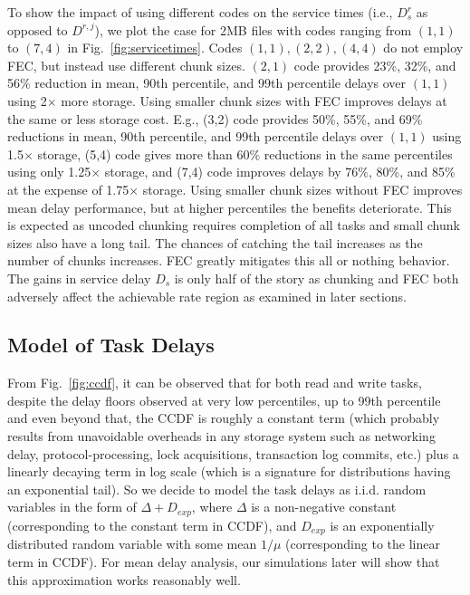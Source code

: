 \documentclass[journal]{IEEEtran}
\begin{document}
To show the impact of using different codes on the service times (i.e., $D_s^r$ as opposed to $D^{r,j}$), we  plot the case for 2MB files with codes ranging from $(1,1)$ to $(7,4)$ in Fig.~\ref{fig:servicetimes}. Codes $(1,1), (2,2), (4,4)$ do not employ FEC, but instead use different chunk sizes. $(2,1)$ code provides 23\%, 32\%, and 56\% reduction in mean, 90th percentile, and 99th percentile delays over $(1,1)$ using 2$\times$ more storage. 
Using smaller chunk sizes with FEC improves delays at the same or less storage cost. E.g., (3,2) code provides 
50\%, 55\%, and 69\% reductions in mean, 90th percentile, and 99th percentile delays over $(1,1)$ using 1.5$\times$ storage, (5,4) code gives more than 60\% reductions in the same percentiles using only 1.25$\times$ storage, and (7,4) code improves delays by 76\%, 80\%, and 85\% at the expense of 1.75$\times$ storage.
Using smaller chunk sizes without FEC improves mean delay performance, but at higher percentiles the benefits deteriorate. This is expected as uncoded chunking requires completion of all tasks and small chunk sizes also have a long tail. The chances of catching the tail increases as the number of chunks increases.  FEC greatly mitigates this all or nothing behavior. 
The gains in service delay $D_s$ is only half of the story as chunking and FEC both adversely affect the achievable rate region as examined in later sections.


\subsection{Model of Task Delays}
\label{ssec:model:delay}
From Fig.~\ref{fig:ccdf}, it can be observed that for both read and write tasks, despite the delay floors observed at very low percentiles,  up to 99th percentile and even beyond that, 
the CCDF is roughly a constant term (which probably results from unavoidable overheads in any storage system such as networking delay, protocol-processing, lock acquisitions, transaction log commits, etc.) plus a linearly decaying term in log scale (which is a signature for distributions having an exponential tail). 
So we decide to model the task delays as i.i.d. random variables in the form of $\Delta + D_{exp}$, where $\Delta$ is a non-negative constant (corresponding to the constant term in CCDF), and $D_{exp}$ is an exponentially distributed random variable with some mean $1/\mu$ (corresponding to the linear term in CCDF). 
For mean delay analysis, our simulations later will show that this approximation works reasonably well.
\end{document}

